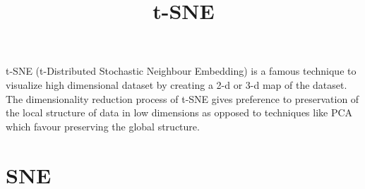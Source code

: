 \documentclass[11pt, a4paper]{article}
\begin{document}
\title{t-SNE}
\date{}
\maketitle

t-SNE (t-Distributed Stochastic Neighbour Embedding) is a famous technique to visualize high dimensional dataset by creating a 2-d or 3-d map of the dataset. The dimensionality reduction process of t-SNE gives preference to preservation of the local structure of data in low dimensions as opposed to techniques like PCA which favour preserving the global structure.

\section{SNE}
\end{document}
